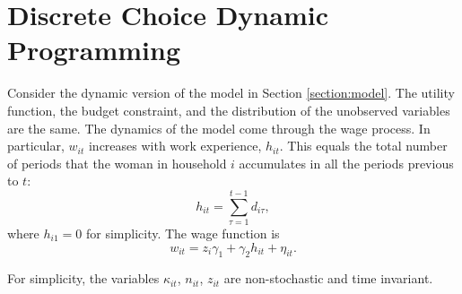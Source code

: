 \section{Discrete Choice Dynamic Programming} \label{section:dynamic}
Consider the dynamic version of the model in Section \ref{section:model}. The utility function, the budget constraint, and the distribution of the unobserved variables are the same. The dynamics of the model come through the wage process. In particular, $w_{it}$ increases with work experience, $h_{it}$. This equals the total number of periods that the woman in household $i$ accumulates in all the periods previous to $t$:
\begin{equation}
h_{it} = \sum\limits_{\tau=1}^{t-1} d_{i\tau},
\end{equation} 
\noindent where $h_{i1} = 0$ for simplicity. The wage function is
\begin{equation}
w_{it} = z_{i}\gamma_{1} + \gamma_{2}h_{it} + \eta_{it}.
\end{equation} 

\noindent For simplicity, the variables $\kappa_{it}$, $n_{it}$, $z_{it}$ are non-stochastic and time invariant.

